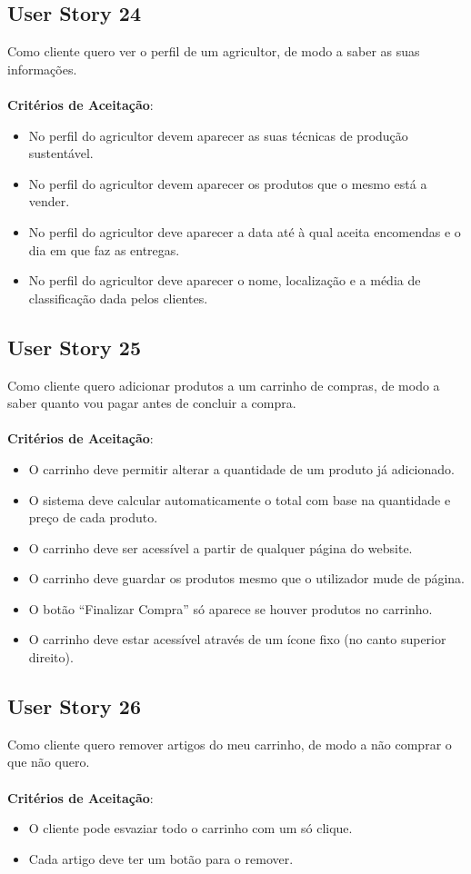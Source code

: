 \documentclass[a4paper,11pt]{article}
\begin{document}
\subsection{User Story 24}
Como cliente quero ver o perfil de um agricultor, de modo a saber as suas informações.\\\\
\textbf{Critérios de Aceitação}:
\begin{itemize}
  \item No perfil do agricultor devem aparecer as suas técnicas de produção sustentável.
  \item No perfil do agricultor devem aparecer os produtos que o mesmo está a vender.
  \item No perfil do agricultor deve aparecer a data até à qual aceita encomendas e o dia em que faz as entregas.
  \item No perfil do agricultor deve aparecer o nome, localização e a média de classificação dada pelos clientes.
\end{itemize}
\subsection{User Story 25}
Como cliente quero adicionar produtos a um carrinho de compras, de modo a saber quanto vou pagar antes de concluir a compra.\\\\
\textbf{Critérios de Aceitação}:
\begin{itemize}
  \item O carrinho deve permitir alterar a quantidade de um produto já adicionado.
  \item O sistema deve calcular automaticamente o total com base na quantidade e preço de cada produto.
  \item O carrinho deve ser acessível a partir de qualquer página do website.
  \item O carrinho deve guardar os produtos mesmo que o utilizador mude de página.
  \item O botão “Finalizar Compra” só aparece se houver produtos no carrinho.
  \item O carrinho deve estar acessível através de um ícone fixo (no canto superior direito).
\end{itemize}
\subsection{User Story 26}
Como cliente quero remover artigos do meu carrinho, de modo a não comprar o que não quero.\\\\
\textbf{Critérios de Aceitação}:
\begin{itemize}
  \item O cliente pode esvaziar todo o carrinho com um só clique.
  \item Cada artigo deve ter um botão para o remover.
\end{itemize}
\end{document}
